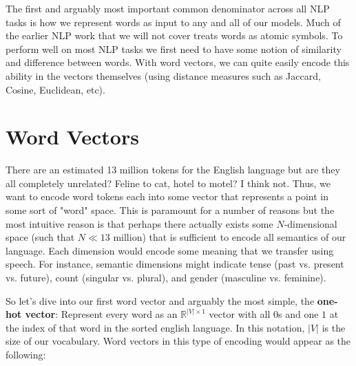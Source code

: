 \documentclass[nobib]{tufte-handout}
\begin{document}
The first and arguably most important common denominator across all NLP tasks is how we represent words as input to any and all of our models. Much of the earlier NLP work that we will not cover treats words as atomic symbols. To perform well on most NLP tasks we first need to have some notion of similarity and difference between words. With word vectors, we can quite easily encode this ability in the vectors themselves (using distance measures such as Jaccard, Cosine, Euclidean, etc).

\section{Word Vectors}\label{sec:wordvectors}

There are an estimated 13 million tokens for the English language but are they all completely unrelated? Feline to cat, hotel to motel? I think not. Thus, we want to encode word tokens each into some vector that represents a point in some sort of "word" space. This is paramount for a number of reasons but the most intuitive reason is that perhaps there actually exists some $N$-dimensional space (such that $N\ll13$ million) that is sufficient to encode all semantics of our language. Each dimension would encode some meaning that we transfer using speech. For instance, semantic dimensions might indicate tense (past vs. present vs. future), count (singular vs. plural), and gender (masculine vs. feminine). 


So let's dive into our first word vector and arguably the most simple, the \textbf{one-hot vector}: Represent every word as an $\mathbb{R}^{|V|\times1}$ vector with all $0$s and one $1$ at the index of that word in the sorted english language. In this notation, $|V|$ is the size of our vocabulary. Word vectors in this type of encoding would appear as the following:
\end{document}
